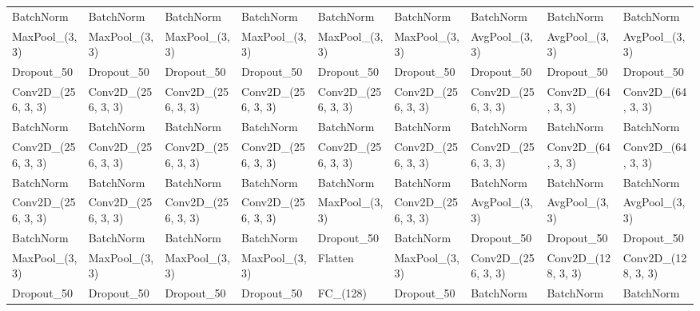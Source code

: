 \begin{table}
{\begin{tabular}{@{}lllllllll@{}}
BatchNorm             & BatchNorm             & BatchNorm             & BatchNorm             & BatchNorm             & BatchNorm             & BatchNorm             & BatchNorm             & BatchNorm             \\
MaxPool\_(3, 3)       & MaxPool\_(3, 3)       & MaxPool\_(3, 3)       & MaxPool\_(3, 3)       & MaxPool\_(3, 3)       & MaxPool\_(3, 3)       & AvgPool\_(3, 3)       & AvgPool\_(3, 3)       & AvgPool\_(3, 3)       \\
Dropout\_50           & Dropout\_50           & Dropout\_50           & Dropout\_50           & Dropout\_50           & Dropout\_50           & Dropout\_50           & Dropout\_50           & Dropout\_50           \\
Conv2D\_(256, 3, 3)   & Conv2D\_(256, 3, 3)   & Conv2D\_(256, 3, 3)   & Conv2D\_(256, 3, 3)   & Conv2D\_(256, 3, 3)   & Conv2D\_(256, 3, 3)   & Conv2D\_(256, 3, 3)   & Conv2D\_(64, 3, 3)    & Conv2D\_(64, 3, 3)    \\
BatchNorm             & BatchNorm             & BatchNorm             & BatchNorm             & BatchNorm             & BatchNorm             & BatchNorm             & BatchNorm             & BatchNorm             \\
Conv2D\_(256, 3, 3)   & Conv2D\_(256, 3, 3)   & Conv2D\_(256, 3, 3)   & Conv2D\_(256, 3, 3)   & Conv2D\_(256, 3, 3)   & Conv2D\_(256, 3, 3)   & Conv2D\_(256, 3, 3)   & Conv2D\_(64, 3, 3)    & Conv2D\_(64, 3, 3)    \\
BatchNorm             & BatchNorm             & BatchNorm             & BatchNorm             & BatchNorm             & BatchNorm             & BatchNorm             & BatchNorm             & BatchNorm             \\
Conv2D\_(256, 3, 3)   & Conv2D\_(256, 3, 3)   & Conv2D\_(256, 3, 3)   & Conv2D\_(256, 3, 3)   & MaxPool\_(3, 3)       & Conv2D\_(256, 3, 3)   & AvgPool\_(3, 3)       & AvgPool\_(3, 3)       & AvgPool\_(3, 3)       \\
BatchNorm             & BatchNorm             & BatchNorm             & BatchNorm             & Dropout\_50           & BatchNorm             & Dropout\_50           & Dropout\_50           & Dropout\_50           \\
MaxPool\_(3, 3)       & MaxPool\_(3, 3)       & MaxPool\_(3, 3)       & MaxPool\_(3, 3)       & Flatten               & MaxPool\_(3, 3)       & Conv2D\_(256, 3, 3)   & Conv2D\_(128, 3, 3)   & Conv2D\_(128, 3, 3)   \\
Dropout\_50           & Dropout\_50           & Dropout\_50           & Dropout\_50           & FC\_(128)             & Dropout\_50           & BatchNorm             & BatchNorm             & BatchNorm             \\

\end{tabular}}
\end{table}
